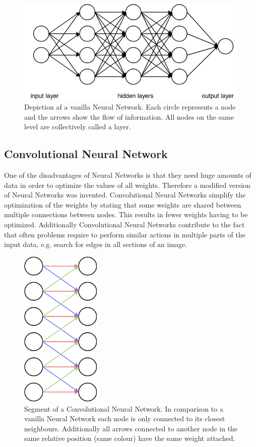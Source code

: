 \begin{figure}[h!]
	\centering
	\includegraphics[width=4.5in]{img/methodology_neuralNetwork_visualizationOfANN.png}
	\caption{Depiction af a vanilla Neural Network. Each circle represents a node and the arrows show the flow of information. All nodes on the same level are collectively called a layer.}
	\label{pic:methodology_neuralNetwork_visualizationOfANN}
\end{figure}

\subsection{Convolutional Neural Network}
One of the disadvantages of Neural Networks is that they need huge amounts of data in order to optimize the values of all weights. Therefore a modified version of Neural Networks was invented. Convolutional Neural Networks simplify the optimization of the weights by stating that some weights are shared between multiple connections between nodes. This results in fewer weights having to be optimized. Additionally Convolutional Neural Networks contribute to the fact that often problems require to perform similar actions in multiple parts of the input data, e.g. search for edges in all sections of an image.

\begin{figure}[h!]
	\centering
	\includegraphics[width=1.5in]{img/methodology_neuralNetwork_visualizationOfACNN.png}
	\caption{Segment of a Convolutional Neural Network. In comparison to a vanilla Neural Network each node is only connected to its closest neighbours. Additionally all arrows connected to another node in the same relative position (same colour) have the same weight attached.}
	\label{pic:methodology_neuralNetwork_visualizationOfACNN}
\end{figure}


